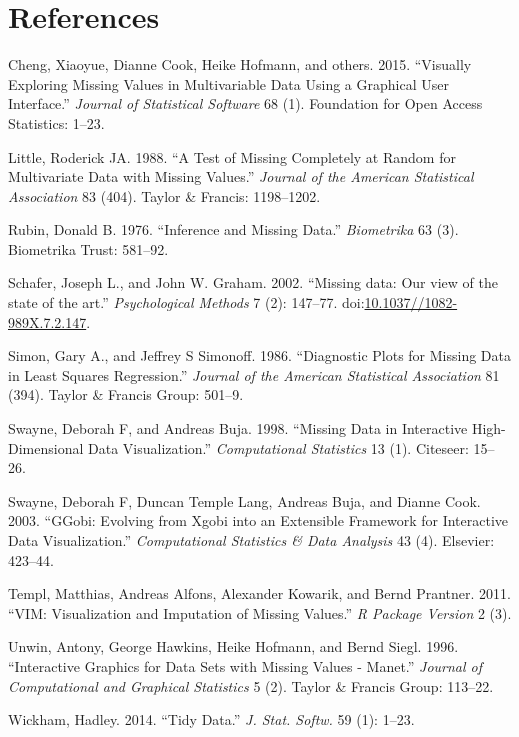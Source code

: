 \documentclass[]{article}
\begin{document}
\section*{References}\label{references}

\hypertarget{refs}{}
\hypertarget{ref-cheng2015}{}
Cheng, Xiaoyue, Dianne Cook, Heike Hofmann, and others. 2015. ``Visually
Exploring Missing Values in Multivariable Data Using a Graphical User
Interface.'' \emph{Journal of Statistical Software} 68 (1). Foundation
for Open Access Statistics: 1--23.

\hypertarget{ref-Little1988}{}
Little, Roderick JA. 1988. ``A Test of Missing Completely at Random for
Multivariate Data with Missing Values.'' \emph{Journal of the American
Statistical Association} 83 (404). Taylor \& Francis: 1198--1202.

\hypertarget{ref-Rubin1976}{}
Rubin, Donald B. 1976. ``Inference and Missing Data.'' \emph{Biometrika}
63 (3). Biometrika Trust: 581--92.

\hypertarget{ref-Schafer2002}{}
Schafer, Joseph L., and John W. Graham. 2002. ``Missing data: Our view
of the state of the art.'' \emph{Psychological Methods} 7 (2): 147--77.
doi:\href{https://doi.org/10.1037//1082-989X.7.2.147}{10.1037//1082-989X.7.2.147}.

\hypertarget{ref-simon-simonoff}{}
Simon, Gary A., and Jeffrey S Simonoff. 1986. ``Diagnostic Plots for
Missing Data in Least Squares Regression.'' \emph{Journal of the
American Statistical Association} 81 (394). Taylor \& Francis Group:
501--9.

\hypertarget{ref-Swayne1998}{}
Swayne, Deborah F, and Andreas Buja. 1998. ``Missing Data in Interactive
High-Dimensional Data Visualization.'' \emph{Computational Statistics}
13 (1). Citeseer: 15--26.

\hypertarget{ref-swayne2003ggobi}{}
Swayne, Deborah F, Duncan Temple Lang, Andreas Buja, and Dianne Cook.
2003. ``GGobi: Evolving from Xgobi into an Extensible Framework for
Interactive Data Visualization.'' \emph{Computational Statistics \& Data
Analysis} 43 (4). Elsevier: 423--44.

\hypertarget{ref-vim}{}
Templ, Matthias, Andreas Alfons, Alexander Kowarik, and Bernd Prantner.
2011. ``VIM: Visualization and Imputation of Missing Values.'' \emph{R
Package Version} 2 (3).

\hypertarget{ref-Unwin1996}{}
Unwin, Antony, George Hawkins, Heike Hofmann, and Bernd Siegl. 1996.
``Interactive Graphics for Data Sets with Missing Values - Manet.''
\emph{Journal of Computational and Graphical Statistics} 5 (2). Taylor
\& Francis Group: 113--22.

\hypertarget{ref-Wickham2014}{}
Wickham, Hadley. 2014. ``Tidy Data.'' \emph{J. Stat. Softw.} 59 (1):
1--23.
\end{document}
